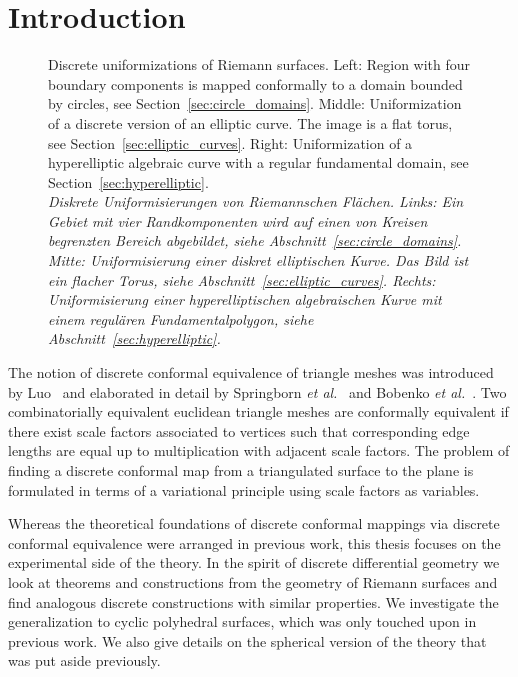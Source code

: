 \documentclass[Thesis.tex]{subfiles}
\begin{document}
\chapter{Introduction}

\begin{figure}
\centering
{}
\caption{
Discrete uniformizations of Riemann surfaces. 
Left: Region with four boundary components is mapped conformally to a domain bounded by circles, see Section~\ref{sec:circle_domains}. 
Middle: Uniformization of a discrete version of an elliptic curve. The image is a flat torus, see Section~\ref{sec:elliptic_curves}. 
Right: Uniformization of a hyperelliptic algebraic curve with a regular fundamental domain, see Section~\ref{sec:hyperelliptic}.\\
\it Diskrete Uniformisierungen von Riemannschen Fl\"{a}chen. 
Links: Ein Gebiet mit vier Randkomponenten wird auf einen von Kreisen begrenzten Bereich abgebildet, siehe Abschnitt~\ref{sec:circle_domains}.
Mitte: Uniformisierung einer diskret elliptischen Kurve. Das Bild ist ein flacher Torus, siehe Abschnitt~\ref{sec:elliptic_curves}.
Rechts: Uniformisierung einer hyperelliptischen algebraischen Kurve mit einem regul\"{a}ren Fundamentalpolygon, siehe Abschnitt~\ref{sec:hyperelliptic}.
}
\label{fig:intro_uniformizations} 
\end{figure}

The notion of discrete conformal equivalence of triangle meshes was introduced by Luo~\cite{Luo2004:Yamabe} and elaborated in detail by Springborn {\it et al.}~\cite{Springborn2008} and Bobenko {\it et al.}~\cite{BPS2015:dconf}. 
Two combinatorially equivalent euclidean triangle meshes are conformally equivalent if there exist scale factors associated to vertices such that corresponding edge lengths are equal up to multiplication with adjacent scale factors.
The problem of finding a discrete conformal map from a triangulated surface to the plane is formulated in terms of a variational principle using scale factors as variables.

Whereas the theoretical foundations of discrete conformal mappings via discrete conformal equivalence were arranged in previous work, this thesis focuses on the experimental side of the theory. 
In the spirit of discrete differential geometry we look at theorems and constructions from the geometry of Riemann surfaces and find analogous discrete constructions with similar properties.
We investigate the generalization to cyclic polyhedral surfaces, which was only touched upon in previous work.
We also give details on the spherical version of the theory that was put aside previously.
\end{document}
